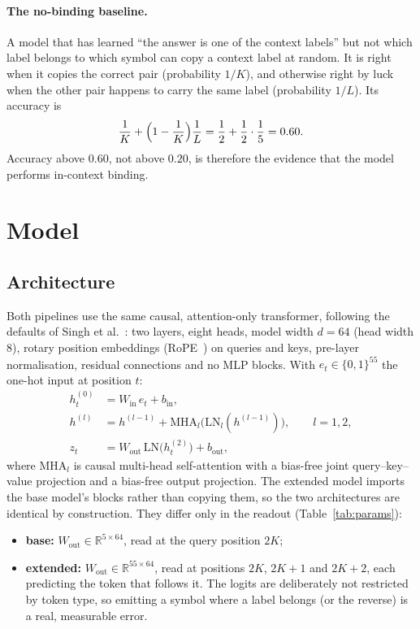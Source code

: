 \documentclass[11pt,a4paper]{article}
\begin{document}
\paragraph{The no-binding baseline.} A model that has learned ``the answer is
one of the context labels'' but not which label belongs to which symbol can
copy a context label at random. It is right when it copies the correct pair
(probability $1/K$), and otherwise right by luck when the other pair happens to
carry the same label (probability $1/L$). Its accuracy is
\[
  \frac{1}{K}+\Bigl(1-\frac{1}{K}\Bigr)\frac{1}{L}=\frac12+\frac12\cdot\frac15=0.60 .
\]
Accuracy above $0.60$, not above $0.20$, is therefore the evidence that the
model performs in-context binding.

\section{Model}\label{sec:model}

\subsection{Architecture}
Both pipelines use the same causal, attention-only transformer, following the
defaults of Singh et al.~\cite{singh2024}: two layers, eight heads, model
width $d=64$ (head width 8), rotary position embeddings
(RoPE~\cite{su2021}) on queries and keys, pre-layer normalisation, residual
connections and no MLP blocks. With $e_t\in\{0,1\}^{55}$ the one-hot input at
position $t$:
\begin{align}
  h^{(0)}_t &= W_{\mathrm{in}}\, e_t + b_{\mathrm{in}},\\
  h^{(l)} &= h^{(l-1)} + \mathrm{MHA}_l\!\bigl(\mathrm{LN}_l(h^{(l-1)})\bigr),\qquad l=1,2,\\
  z_t &= W_{\mathrm{out}}\,\mathrm{LN}\bigl(h^{(2)}_t\bigr) + b_{\mathrm{out}},
\end{align}
where $\mathrm{MHA}_l$ is causal multi-head self-attention with a bias-free
joint query--key--value projection and a bias-free output projection. The
extended model imports the base model's blocks rather than copying them, so
the two architectures are identical by construction. They differ only in the
readout (Table~\ref{tab:params}):
\begin{itemize}[leftmargin=1.4em]
  \item \textbf{base:} $W_{\mathrm{out}}\in\mathbb{R}^{5\times 64}$, read at the
        query position $2K$;
  \item \textbf{extended:} $W_{\mathrm{out}}\in\mathbb{R}^{55\times 64}$, read at
        positions $2K$, $2K+1$ and $2K+2$, each predicting the token that
        follows it. The logits are deliberately not restricted by token type,
        so emitting a symbol where a label belongs (or the reverse) is a
        real, measurable error.
\end{itemize}
\end{document}
